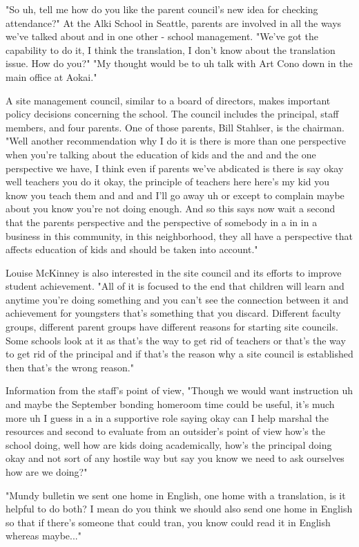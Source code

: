 "So uh, tell me how do you like the parent council's new idea for checking attendance?" At the Alki School in Seattle, parents are involved in all the ways we've talked about and in one other - school management.
"We've got the capability to do it, I think the translation, I don't know about the translation issue.
How do you?" "My thought would be to uh talk with Art Cono down in the main office at Aokai."

A site management council, similar to a board of directors, makes important policy decisions concerning the school.
The council includes the principal, staff members, and four parents.
One of those parents, Bill Stahlser, is the chairman.
"Well another recommendation why I do it is there is more than one perspective when you're talking about the education of kids and the and and the one perspective we have, I think even if parents we've abdicated is there is say okay well teachers you do it okay, the principle of teachers here here's my kid you know you teach them and and and I'll go away uh or except to complain maybe about you know you're not doing enough.
And so this says now wait a second that the parents perspective and the perspective of somebody in a in in a business in this community, in this neighborhood, they all have a perspective that affects education of kids and should be taken into account."

Louise McKinney is also interested in the site council and its efforts to improve student achievement.
"All of it is focused to the end that children will learn and anytime you're doing something and you can't see the connection between it and achievement for youngsters that's something that you discard.
Different faculty groups, different parent groups have different reasons for starting site councils.
Some schools look at it as that's the way to get rid of teachers or that's the way to get rid of the principal and if that's the reason why a site council is established then that's the wrong reason."

Information from the staff's point of view, "Though we would want instruction uh and maybe the September bonding homeroom time could be useful, it's much more uh I guess in a in a supportive role saying okay can I help marshal the resources and second to evaluate from an outsider's point of view how's the school doing, well how are kids doing academically, how's the principal doing okay and not sort of any hostile way but say you know we need to ask ourselves how are we doing?"

"Mundy bulletin we sent one home in English, one home with a translation, is it helpful to do both?
I mean do you think we should also send one home in English so that if there's someone that could tran, you know could read it in English whereas maybe..."

